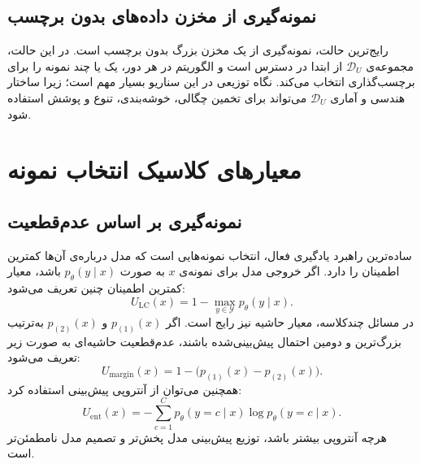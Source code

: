 \documentclass[12pt,a4paper,oneside]{report}
\newcommand{\cD}{\mathcal{D}}
\newcommand{\cY}{\mathcal{Y}}
\begin{document}
\subsection{نمونه‌گیری از مخزن داده‌های بدون برچسب}
رایج‌ترین حالت، نمونه‌گیری از یک مخزن بزرگ بدون برچسب است. در این حالت، مجموعه‌ی $\cD_U$ از ابتدا در دسترس است و الگوریتم در هر دور، یک یا چند نمونه را برای برچسب‌گذاری انتخاب می‌کند. نگاه توزیعی در این سناریو بسیار مهم است؛ زیرا ساختار هندسی و آماری $\cD_U$ می‌تواند برای تخمین چگالی، خوشه‌بندی، تنوع و پوشش استفاده شود.

\section{معیارهای کلاسیک انتخاب نمونه}
\label{sec:dal_classic_acquisition}

\subsection{نمونه‌گیری بر اساس عدم‌قطعیت}
ساده‌ترین راهبرد یادگیری فعال، انتخاب نمونه‌هایی است که مدل درباره‌ی آن‌ها کمترین اطمینان را دارد. اگر خروجی مدل برای نمونه‌ی $x$ به صورت $p_\theta(y\mid x)$ باشد، معیار کمترین اطمینان چنین تعریف می‌شود:
\begin{equation}
U_{\mathrm{LC}}(x)=1-\max_{y\in\cY}p_\theta(y\mid x).
\end{equation}
در مسائل چندکلاسه، معیار حاشیه نیز رایج است. اگر $p_{(1)}(x)$ و $p_{(2)}(x)$ به‌ترتیب بزرگ‌ترین و دومین احتمال پیش‌بینی‌شده باشند، عدم‌قطعیت حاشیه‌ای به صورت زیر تعریف می‌شود:
\begin{equation}
U_{\mathrm{margin}}(x)=1-\big(p_{(1)}(x)-p_{(2)}(x)\big).
\end{equation}
همچنین می‌توان از آنتروپی پیش‌بینی استفاده کرد:
\begin{equation}
U_{\mathrm{ent}}(x)= -\sum_{c=1}^{C}p_\theta(y=c\mid x)\log p_\theta(y=c\mid x).
\end{equation}
هرچه آنتروپی بیشتر باشد، توزیع پیش‌بینی مدل پخش‌تر و تصمیم مدل نامطمئن‌تر است.
\end{document}
